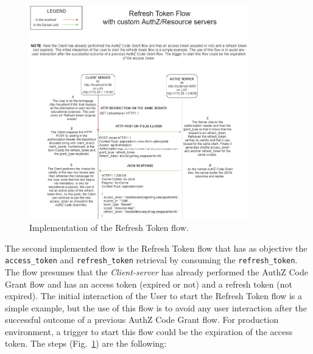 \begin{figure}[h]
    \centering
    \includegraphics[width=0.85\textwidth]{chapters/images/chp6/flow_refresh1.png}
    \caption{Implementation of the Refresh Token flow.}
    \label{fig:refresh1}
\end{figure}

The second implemented flow is the Refresh Token flow that has as objective the \texttt{access\_token} and \texttt{refresh\_token} retrieval by consuming the \texttt{refresh\_token}. The flow presumes that the \textit{Client-server} has already performed the AuthZ Code Grant flow and has an access token (expired or not) and a refresh token (not expired). The initial interaction of the User to start the Refresh Token flow is a simple example, but the use of this flow is to avoid any user interaction after the successful outcome of a previous AuthZ Code Grant flow. For production environment, a trigger to start this flow could be the expiration of the access token. The steps (Fig.~\ref{fig:refresh1}) are the following:

